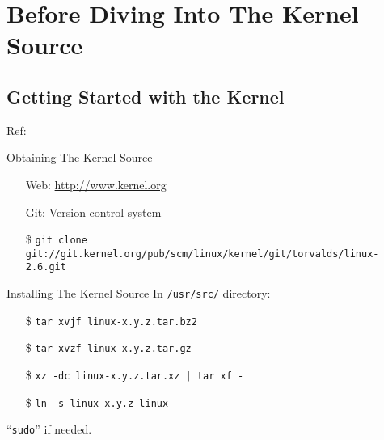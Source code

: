 \mode*


\section{Before Diving Into The Kernel Source}

\subsection{Getting Started with the Kernel}

Ref: 

\begin{frame}[fragile=singleslide]{Obtaining The Kernel Source}
  \begin{itemize}
  \item[Web:] \url{http://www.kernel.org}
  \item[Git:] Version control system
  \end{itemize}
  {\scriptsize
    \begin{itemize}
    \item[\$] \texttt{git clone git://git.kernel.org/pub/scm/linux/kernel/git/torvalds/linux-2.6.git}
    \end{itemize}}
\end{frame}

\begin{frame}{Installing The Kernel Source}
  In \texttt{/usr/src/} directory:
  \begin{itemize}
  \item[\$] \texttt{tar xvjf linux-x.y.z.tar.bz2}
  \item[\$] \texttt{tar xvzf linux-x.y.z.tar.gz}
  \item[\$] \texttt{xz -dc linux-x.y.z.tar.xz | tar xf -}
  \item[\$] \texttt{ln -s linux-x.y.z linux}
  \end{itemize}
  ``\texttt{sudo}'' if needed.
\end{frame}

